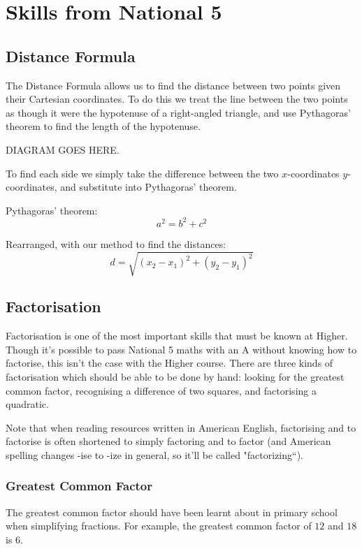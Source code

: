 \chapter{Skills from National 5}

\section{Distance Formula}
The Distance Formula allows us to find the distance between two points given their Cartesian coordinates. To do this we treat the line between the two points as though it were the hypotenuse of a right-angled triangle, and use Pythagoras' theorem to find the length of the hypotenuse.

DIAGRAM GOES HERE.

To find each side we simply take the difference between the two $x$-coordinates $y$-coordinates, and substitute into Pythagoras' theorem.

Pythagoras' theorem:
\begin{equation*}
	a^2 = b^2+c^2
\end{equation*}

Rearranged, with our method to find the distances:
\begin{equation*}
	d = \sqrt{(x_2-x_1)^2+(y_2-y_1)^2}
\end{equation*}


\section{Factorisation}
Factorisation is one of the most important skills that must be known at Higher. Though it's possible to pass National 5 maths with an A without knowing how to factorise, this isn't the case with the Higher course. There are three kinds of factorisation which should be able to be done by hand: looking for the greatest common factor, recognising a difference of two squares, and factorising a quadratic.

Note that when reading resources written in American English, factorising and to factorise is often shortened to simply factoring and to factor (and American spelling changes -ise to -ize in general, so it'll be called "factorizing``).

\subsection{Greatest Common Factor}
The greatest common factor should have been learnt about in primary school when simplifying fractions. For example, the greatest common factor of $12$ and $18$ is $6$.

